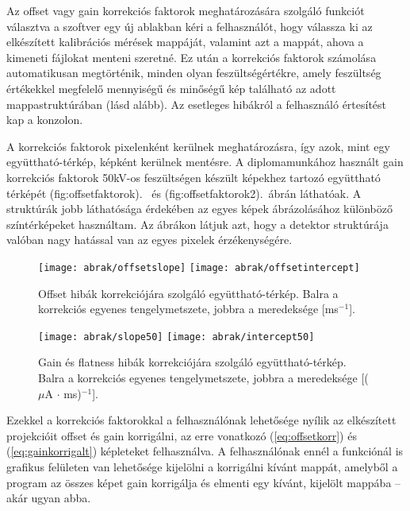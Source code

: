 \documentclass[a4paper,12pt]{article}
\begin{document}
Az offset vagy gain korrekciós faktorok meghatározására szolgáló funkciót választva a szoftver egy új ablakban kéri a felhasználót, hogy  válassza ki az elkészített kalibrációs mérések mappáját, valamint azt a mappát, ahova a kimeneti fájlokat menteni szeretné. Ez után a korrekciós faktorok számolása automatikusan megtörténik, minden olyan feszültségértékre, amely feszültség értékekkel megfelelő mennyiségű és minőségű kép található az adott mappastruktúrában (lásd alább). Az esetleges hibákról a felhasználó értesítést kap a konzolon.
 
 
 

A korrekciós faktorok  pixelenként kerülnek meghatározásra, így azok, mint egy együttható-térkép, képként  kerülnek mentésre.
 A diplomamunkához használt gain korrekciós faktorok 50kV-os feszültségen készült képekhez tartozó együttható térképét \aref({fig:offsetfaktorok}).~ és \aref({fig:offsetfaktorok2}).~ábrán láthatóak. A struktúrák jobb láthatósága érdekében az egyes képek ábrázolásához különböző színtérképeket használtam. Az ábrákon látjuk azt, hogy a detektor struktúrája valóban nagy hatással van az egyes pixelek érzékenységére. 
 
 
 \begin{figure}[htbp]
\center
\texttt{[image: abrak/offsetslope]}
\texttt{[image: abrak/offsetintercept]}
\caption{Offset hibák korrekciójára szolgáló együttható-térkép. Balra a korrekciós egyenes tengelymetszete, jobbra a meredeksége [ms$^{-1}$].}
\label{fig:offsetfaktorok}
\end{figure}

 
 
  \begin{figure}[htbp]
\center
\texttt{[image: abrak/slope50]}
\texttt{[image: abrak/intercept50]}
\caption{Gain és flatness hibák korrekciójára szolgáló együttható-térkép. Balra a korrekciós egyenes tengelymetszete, jobbra a meredeksége [($\mu$A $\cdot$ ms)$^{-1}$].}
\label{fig:offsetfaktorok2}
\end{figure}

 
 

 Ezekkel a korrekciós faktorokkal a felhasználónak lehetősége nyílik az elkészített projekcióit offset és gain korrigálni, az erre vonatkozó (\ref{eq:offsetkorr}) és (\ref{eq:gainkorrigalt}) képleteket felhasználva.  A felhasználónak ennél a funkciónál is grafikus felületen van lehetősége kijelölni a korrigálni kívánt mappát, amelyből a program az összes képet gain korrigálja és elmenti egy kívánt, kijelölt mappába -- akár ugyan abba. 
 
\end{document}
